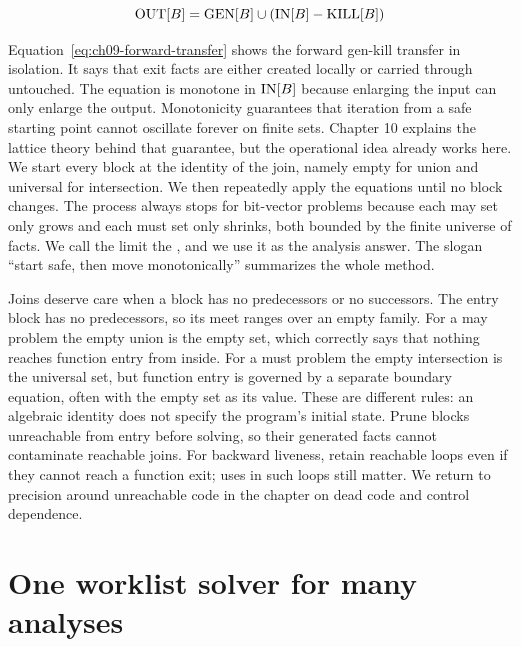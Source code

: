 \begin{equation}
\mathrm{OUT}[B] = \mathrm{GEN}[B] \cup (\mathrm{IN}[B] - \mathrm{KILL}[B])
\label{eq:ch09-forward-transfer}
\end{equation}

Equation~\ref{eq:ch09-forward-transfer} shows the forward gen-kill transfer in isolation.
It says that exit facts are either created locally or carried through untouched.
The equation is monotone in $\mathrm{IN}[B]$ because enlarging the input can only enlarge the output.
Monotonicity guarantees that iteration from a safe starting point cannot oscillate forever on finite sets.
Chapter 10 explains the lattice theory behind that guarantee, but the operational idea already works here.
We start every block at the identity of the join, namely empty for union and universal for intersection.
We then repeatedly apply the equations until no block changes.
The process always stops for bit-vector problems because each may set only grows and each must set only shrinks, both bounded by the finite universe of facts.
We call the limit the , and we use it as the analysis answer.
The slogan \enquote{start safe, then move monotonically} summarizes the whole method.

Joins deserve care when a block has no predecessors or no successors.
The entry block has no predecessors, so its meet ranges over an empty family.
For a may problem the empty union is the empty set, which correctly says that nothing reaches function entry from inside.
For a must problem the empty intersection is the universal set, but function entry is governed by a separate boundary equation, often with the empty set as its value.
These are different rules: an algebraic identity does not specify the program's initial state.
Prune blocks unreachable from entry before solving, so their generated facts cannot contaminate reachable joins.
For backward liveness, retain reachable loops even if they cannot reach a function exit; uses in such loops still matter.
We return to precision around unreachable code in the chapter on dead code and control dependence.

\section{One worklist solver for many analyses}
\label{sec:ch09-solver}

